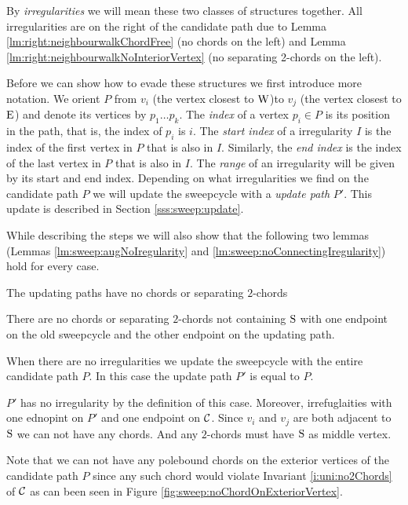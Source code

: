   By \emph{irregularities} we will mean these two classes of structures together.
  All irregularities are on the right of the candidate path due to Lemma \ref{lm:right:neighbourwalkChordFree} (no chords on the left) and Lemma \ref{lm:right:neighbourwalkNoInteriorVertex} (no separating 2-chords on the left).

  Before we can show how to evade these structures we first introduce more notation. We orient $P$ from $v_i$ (the vertex closest to $\mathrm{W}$)to $v_j$ (the vertex closest to $\mathrm{E}$) and denote its vertices by $p_1 \ldots p_k$.
  The \emph{index} of a vertex $p_i \in P$ is its position in the path, that is, the index of $p_i$ is $i$.
  The \emph{start index} of a irregularity $I$ is the index of the first vertex in $P$ that is also in $I$. Similarly, the \emph{end index} is the index of the last vertex in $P$ that is also in $I$.
  The \emph{range} of an irregularity will be given by its start and end index. Depending on what irregularities we find on the candidate path $P$ we will update the sweepcycle with a \emph{update path} $P'$. This update is described in Section \ref{sss:sweep:update}.

  While describing the steps we will also show that the following two lemmas (Lemmas \ref{lm:sweep:augNoIregularity} and \ref{lm:sweep:noConnectingIregularity}) hold for every case.

  \begin{lemma}
    The updating paths have no chords or separating $2$-chords
    \label{lm:sweep:augNoIregularity}
  \end{lemma}

  \begin{lemma}
    \label{lm:sweep:noConnectingIregularity}
    There are no chords or separating $2$-chords not containing $\mathrm{S}$ with one endpoint on the old sweepcycle and the other endpoint on the updating path.
  \end{lemma}

    When there are no irregularities we update the sweepcycle with the entire candidate path $P$.
    In this case the update path $P'$ is equal to $P$.

    $P'$ has no irregularity by the definition of this case. Moreover, irrefuglaities with one ednopint on $P'$ and one endpoint on $\mathcal{C}$. Since $v_i$ and $v_j$ are both adjacent to $\mathrm{S}$ we can not have any chords. And any $2$-chords must have $\mathrm{S}$ as middle vertex.

    Note that we can not have any polebound chords on the exterior vertices of the candidate path $P$ since any such chord would violate Invariant \ref{i:uni:no2Chords} of $\mathcal{C}$ as can been seen in Figure \ref{fig:sweep:noChordOnExteriorVertex}.

